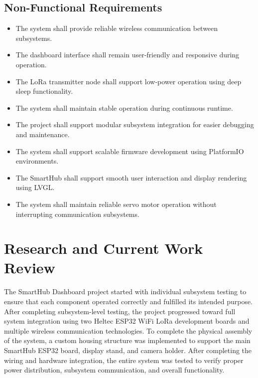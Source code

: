 \documentclass[11pt,letterpaper]{article}
\begin{document}
\subsection{Non-Functional Requirements}
\begin{itemize}[leftmargin=*]
    \item The system shall provide reliable wireless communication
          between subsystems.
    \item The dashboard interface shall remain user-friendly and
          responsive during operation.
    \item The LoRa transmitter node shall support low-power operation
          using deep sleep functionality.
    \item The system shall maintain stable operation during continuous
          runtime.
    \item The project shall support modular subsystem integration for
          easier debugging and maintenance.
    \item The system shall support scalable firmware development using
          PlatformIO environments.
    \item The SmartHub shall support smooth user interaction and
          display rendering using LVGL.
    \item The system shall maintain reliable servo motor operation
          without interrupting communication subsystems.
\end{itemize}

\section{Research and Current Work Review}
The SmartHub Dashboard project started with individual subsystem
testing to ensure that each component operated correctly and fulfilled
its intended purpose. After completing subsystem-level testing, the
project progressed toward full system integration using two Heltec
ESP32 WiFi LoRa development boards and multiple wireless communication
technologies. To complete the physical assembly of the system, a
custom housing structure was implemented to support the main SmartHub
ESP32 board, display stand, and camera holder. After completing the
wiring and hardware integration, the entire system was tested to
verify proper power distribution, subsystem communication, and overall
functionality.
\end{document}
